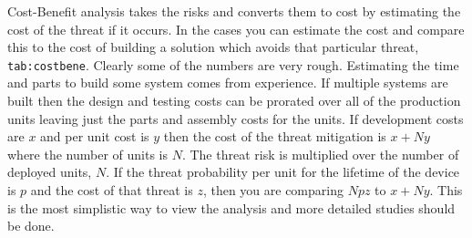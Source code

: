 Cost-Benefit analysis takes the risks and converts them to cost by
estimating the cost of the threat if it occurs. In the cases you can
estimate the cost and compare this to the cost of building a solution
which avoids that particular threat, \texttt{tab:costbene}. Clearly some
of the numbers are very rough. Estimating the time and parts to build
some system comes from experience. If multiple systems are built then
the design and testing costs can be prorated over all of the production
units leaving just the parts and assembly costs for the units. If
development costs are \(x\) and per unit cost is \(y\) then the cost of
the threat mitigation is \(x + Ny\) where the number of units is \(N\).
The threat risk is multiplied over the number of deployed units, \(N\).
If the threat probability per unit for the lifetime of the device is
\(p\) and the cost of that threat is \(z\), then you are comparing
\(Npz\) to \(x+Ny\). This is the most simplistic way to view the
analysis and more detailed studies should be done.

